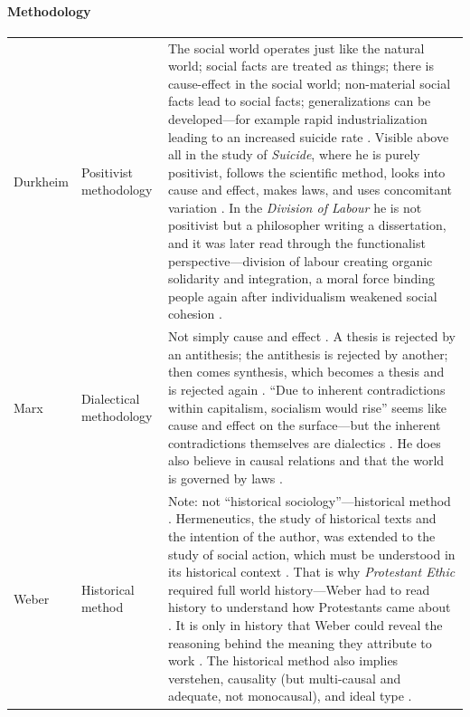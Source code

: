 \paragraph{Methodology}
\vspace{6pt}
\noindent
\begin{tabularx}{\textwidth}{>{\hsize}Y >{\hsize}Y >{\hsize}Y}
\toprule
{}
 &  &  \\
\midrule
Durkheim & Positivist methodology & The social world operates just like the natural world; social facts are treated as things; there is cause-effect in the social world; non-material social facts lead to social facts; generalizations can be developed---for example rapid industrialization leading to an increased suicide rate . Visible above all in the study of \textit{Suicide}, where he is purely positivist, follows the scientific method, looks into cause and effect, makes laws, and uses concomitant variation . In the \textit{Division of Labour} he is not positivist but a philosopher writing a dissertation, and it was later read through the functionalist perspective---division of labour creating organic solidarity and integration, a moral force binding people again after individualism weakened social cohesion . \\
\midrule
Marx & Dialectical methodology & Not simply cause and effect . A thesis is rejected by an antithesis; the antithesis is rejected by another; then comes synthesis, which becomes a thesis and is rejected again . ``Due to inherent contradictions within capitalism, socialism would rise'' seems like cause and effect on the surface---but the inherent contradictions themselves are dialectics . He does also believe in causal relations and that the world is governed by laws . \\
\midrule
Weber & Historical method & Note: not ``historical sociology''---historical method . Hermeneutics, the study of historical texts and the intention of the author, was extended to the study of social action, which must be understood in its historical context . That is why \textit{Protestant Ethic} required full world history---Weber had to read history to understand how Protestants came about . It is only in history that Weber could reveal the reasoning behind the meaning they attribute to work . The historical method also implies verstehen, causality (but multi-causal and adequate, not monocausal), and ideal type . \\
\bottomrule
\end{tabularx}
\vspace{6pt}

